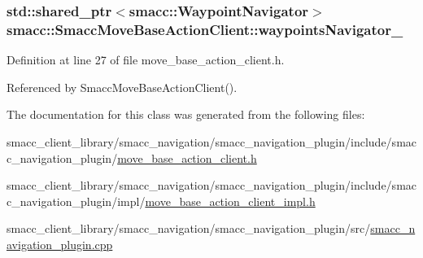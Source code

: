 \subsubsection[{\texorpdfstring{waypoints\+Navigator\+\_\+}{waypointsNavigator_}}]{\setlength{\rightskip}{0pt plus 5cm}std\+::shared\+\_\+ptr$<${\bf smacc\+::\+Waypoint\+Navigator}$>$ smacc\+::\+Smacc\+Move\+Base\+Action\+Client\+::waypoints\+Navigator\+\_\+}\hypertarget{classsmacc_1_1SmaccMoveBaseActionClient_a59b095c4c17b17dc28f4a21417b88333}{}\label{classsmacc_1_1SmaccMoveBaseActionClient_a59b095c4c17b17dc28f4a21417b88333}


Definition at line 27 of file move\+\_\+base\+\_\+action\+\_\+client.\+h.



Referenced by Smacc\+Move\+Base\+Action\+Client().



The documentation for this class was generated from the following files\+:\begin{DoxyCompactItemize}
\item 
smacc\+\_\+client\+\_\+library/smacc\+\_\+navigation/smacc\+\_\+navigation\+\_\+plugin/include/smacc\+\_\+navigation\+\_\+plugin/\hyperlink{move__base__action__client_8h}{move\+\_\+base\+\_\+action\+\_\+client.\+h}\item 
smacc\+\_\+client\+\_\+library/smacc\+\_\+navigation/smacc\+\_\+navigation\+\_\+plugin/include/smacc\+\_\+navigation\+\_\+plugin/impl/\hyperlink{move__base__action__client__impl_8h}{move\+\_\+base\+\_\+action\+\_\+client\+\_\+impl.\+h}\item 
smacc\+\_\+client\+\_\+library/smacc\+\_\+navigation/smacc\+\_\+navigation\+\_\+plugin/src/\hyperlink{smacc__navigation__plugin_8cpp}{smacc\+\_\+navigation\+\_\+plugin.\+cpp}\end{DoxyCompactItemize}
